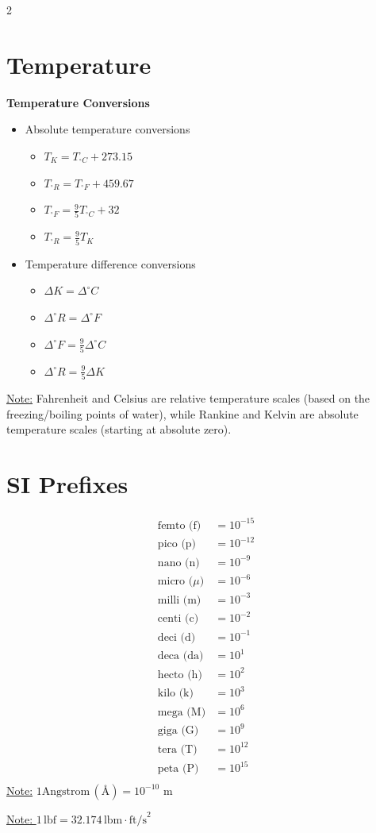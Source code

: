 \documentclass[10pt, fleqn]{article}
\begin{document}
\begin{multicols}{2}
\section*{Temperature}
\textbf{Temperature Conversions}
\begin{itemize}[label=\textbullet]
    \item Absolute temperature conversions
    \begin{itemize}[label=\textopenbullet]
        \item $T_{K} = T_{^\circ C} + 273.15$
        \item $T_{^\circ R} = T_{^\circ F} + 459.67$
        \item $T_{^\circ F} = \frac{9}{5}T_{^\circ C} + 32$
        \item $T_{^\circ R} = \frac{9}{5}T_{K}$
    \end{itemize}
    \item Temperature difference conversions
    \begin{itemize}[label=\textopenbullet]
        \item $\Delta K = \Delta ^\circ C$
        \item $\Delta ^\circ R = \Delta ^\circ F$
        \item $\Delta ^\circ F = \frac{9}{5}\Delta ^\circ C$
        \item $\Delta ^\circ R = \frac{9}{5}\Delta K$
    \end{itemize}
\end{itemize}
\underline{Note:} Fahrenheit and Celsius are relative temperature scales (based on the freezing/boiling points of water), while Rankine and Kelvin are absolute temperature scales (starting at absolute zero).
\section*{SI Prefixes}
\makeatletter
\@fleqnfalse
\makeatother
\[\begin{aligned}
\text{femto (f)}  &= 10^{-15} \\
\text{pico (p)}   &= 10^{-12} \\
\text{nano (n)}   &= 10^{-9} \\
\text{micro ($\mu$)}  &= 10^{-6} \\
\text{milli (m)}  &= 10^{-3} \\
\text{centi (c)}  &= 10^{-2} \\
\text{deci (d)}   &= 10^{-1} \\
\text{deca (da)}  &= 10^{1} \\
\text{hecto (h)}  &= 10^{2} \\
\text{kilo (k)}   &= 10^{3} \\
\text{mega (M)}   &= 10^{6} \\
\text{giga (G)}   &= 10^{9} \\
\text{tera (T)}   &= 10^{12} \\
\text{peta (P)}   &= 10^{15} \\
\end{aligned}\]
\makeatletter
\@fleqntrue
\makeatother
\underline{Note:} $1\text{Angstrom}\,(\text{\AA}) = 10^{-10}$ m
\end{multicols}\noindent
\underline{Note: $1\,\text{lbf} = 32.174\,\text{lbm} \cdot \text{ft/s}^2$}
\newpage
\makeatletter
\@fleqnfalse
\makeatother
\end{document}
